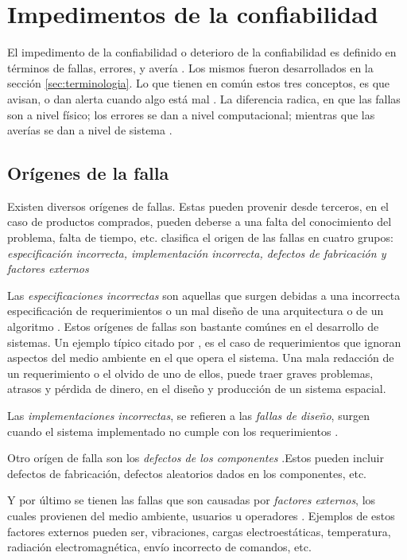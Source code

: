 \section{Impedimentos de la confiabilidad}\label{sec:impedimentos}
El impedimento de la confiabilidad o deterioro de la confiabilidad es definido en términos de
fallas, errores, y avería \citep{FTDesign}. Los mismos fueron desarrollados en la sección
\ref{sec:terminologia}. Lo que tienen en común estos tres conceptos, es que avisan, o dan alerta
cuando algo está mal \citep{FTDesign}. La diferencia radica, en que las fallas son a nivel físico;
los errores se dan a nivel computacional; mientras que las averías se dan a nivel de sistema
\citep{FTDesign}.

\subsection{Orígenes de la falla}
Existen diversos orígenes de fallas. Estas pueden provenir desde terceros, en el caso de productos
comprados, pueden deberse a una falta del conocimiento del problema, falta de tiempo, etc.
\cite{FTDesign} clasifica el origen de las fallas en cuatro grupos: \textit{especificación
incorrecta, implementación incorrecta, defectos de fabricación y factores externos}

Las \textit{especificaciones incorrectas} son aquellas que surgen debidas a una incorrecta
especificación de requerimientos o un mal diseño de una arquitectura o de un algoritmo
\citep{FTDesign}. Estos orígenes de fallas son bastante comúnes en el desarrollo de sistemas. Un
ejemplo típico citado por \cite{FTDesign}, es el caso de requerimientos que ignoran aspectos del
medio ambiente en el que opera el sistema. Una mala redacción de un requerimiento o el olvido de
uno de ellos, puede traer graves problemas, atrasos y pérdida de dinero,  en el diseño y producción
de un sistema espacial.

Las \textit{implementaciones incorrectas}, se refieren a las \textit{fallas de diseño}, surgen
cuando el sistema implementado no cumple con los requerimientos \citep{FTDesign}.

Otro orígen de falla son los \textit{defectos de los componentes} \citep{FTDesign}.Estos pueden
incluir defectos de fabricación, defectos aleatorios dados en los componentes, etc.

Y por último se tienen las fallas que son causadas por \textit{factores externos}, los cuales
provienen del medio ambiente, usuarios u operadores \citep{FTDesign}. Ejemplos de estos factores
externos pueden ser, vibraciones, cargas electroestáticas, temperatura, radiación electromagnética,
envío incorrecto de comandos, etc.

